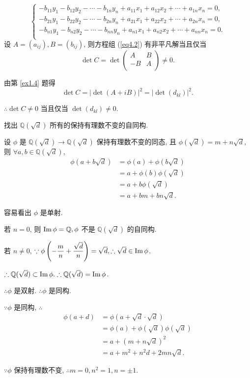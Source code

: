 \documentclass[UTF8]{ctexart}
\begin{document}
\begin{solution}
\begin{equation}
\begin{cases}
            -b_{11}y_1-b_{12}y_2-\cdots-b_{1n}y_n+a_{11}x_1+a_{12}x_2+\cdots+a_{1n}x_n=0, \\
            -b_{21}y_1-b_{22}y_2-\cdots-b_{2n}y_n+a_{21}x_1+a_{22}x_2+\cdots+a_{2n}x_n=0, \\
            -b_{n1}y_1-b_{n2}y_2-\cdots-b_{nn}y_n+a_{n1}x_1+a_{n2}x_2+\cdots+a_{nn}x_n=0. \\
        \end{cases}
    \end{equation}
    设 $A=(a_{ij}),B=(b_{ij})$, 则方程组 (\ref{eq4.2}) 有非平凡解当且仅当
    \[\det C=\det\begin{pmatrix}
        A & B \\
        -B & A \\
    \end{pmatrix}\neq0.\]

    由第 \ref{ex1.4} 题得
    \[\det C=|\det(A+iB)|^2=|\det(d_{kl})|^2.\]

    $\therefore\det C\neq0$ 当且仅当 $\det(d_{kl})\neq0$.
\end{solution}
\begin{exercise}%
    找出 $\mathbb{Q}(\sqrt{d})$ 所有的保持有理数不变的自同构.
\end{exercise}
\begin{solution}
    设 $\phi$ 是 $\mathbb{Q}(\sqrt{d})\to\mathbb{Q}(\sqrt{d})$ 保持有理数不变的同态, 且 $\phi(\sqrt{d})=m+n\sqrt{d}$, 则 $\forall a,b\in\mathbb{Q}(\sqrt{d})$,
    \begin{align*}
        \phi(a+b\sqrt{d}) & =\phi(a)+\phi(b\sqrt{d}) \\
        & =a+\phi(b)\phi(\sqrt{d}) \\
        & =a+b\phi(\sqrt{d}) \\
        & =a+bm+bn\sqrt{d}.
    \end{align*}

    容易看出 $\phi$ 是单射.

    若 $n=0$, 则 $\operatorname{Im} \phi=\mathbb{Q},\phi$ 不是 $\mathbb{Q}(\sqrt{d})$ 的自同构.

    若 $n\neq0$, $\because\phi\left(-\dfrac{m}{n}+\dfrac{\sqrt{d}}{n}\right)=\sqrt{d},\therefore\sqrt{d}\in\operatorname{Im} \phi$.

    $\therefore\mathbb{Q}(\sqrt{d})\subset\operatorname{Im} \phi.\therefore\mathbb{Q}(\sqrt{d})=\operatorname{Im} \phi$.

    $\therefore\phi$ 是双射. $\therefore\phi$ 是同构.

    $\because\phi$ 是同构, $\therefore$
    \begin{align*}
        \phi(a+d) & =\phi(a+\sqrt{d}\cdot\sqrt{d}) \\
        & =\phi(a)+\phi(\sqrt{d})\phi(\sqrt{d}) \\
        & =a+(m+n\sqrt{d})^2 \\
        & =a+m^2+n^2d+2mn\sqrt{d}.
    \end{align*}

    $\because\phi$ 保持有理数不变, $\therefore m=0,n^2=1,n=\pm1$.
\end{solution}
\end{document}
